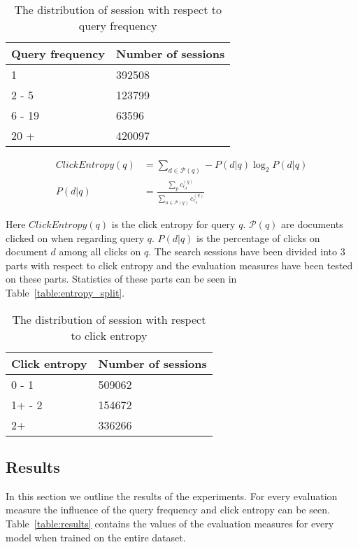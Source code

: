 \begin{table}
\centering
\begin{tabular}{|l|l|}
\hline
Query frequency & Number of sessions \\ \hline
1               & 392508            \\ \hline
2 - 5           & 123799            \\ \hline
6 - 19          & 63596             \\ \hline
20 +            & 420097            \\ \hline
\end{tabular}
\caption{The distribution of session with respect to query frequency}
\label{table:query_split}
\end{table}

\begin{align}
	ClickEntropy(q) &= \sum_{d \in \mathcal{P}(q)} - P(d|q) \log_2 P(d|q) \label{eq:entropy} \\
	P(d|q) &= \frac{\sum_p c_{r_d}^{(q)}}{\sum_{u \in \mathcal{P}(q)} c_{r_u}^{(q)}} \label{eq:entropy_2}
\end{align}

Here $ClickEntropy(q)$ is the click entropy for query $q$. $\mathcal{P}(q)$ are documents clicked on when regarding query $q$. $P(d|q)$ is the percentage of clicks on document $d$ among all clicks on $q$. The search sessions have been divided into 3 parts with respect to click entropy and the evaluation measures have been tested on these parts. Statistics of these parts can be seen in Table~\ref{table:entropy_split}.

\begin{table}
\centering
\begin{tabular}{|l|l|}
\hline
Click entropy & Number of sessions \\ \hline
0 - 1         & 509062             \\ \hline
1+ - 2        & 154672             \\ \hline
2+            & 336266             \\ \hline
\end{tabular}
\caption{The distribution of session with respect to click entropy}
\end{table}

\subsection{Results}
In this section we outline the results of the experiments. For every evaluation measure the influence of the query frequency and click entropy can be seen. Table~\ref{table:results} contains the values of the evaluation measures for every model when trained on the entire dataset.

